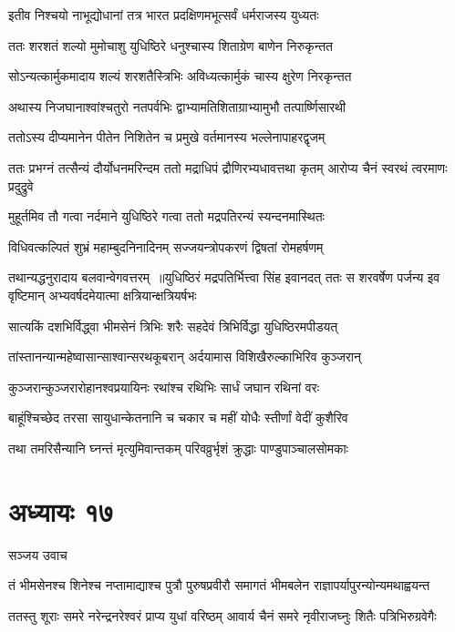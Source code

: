 \twolineshloka
{इतीव निश्चयो नाभूद्योधानां तत्र भारत}
{प्रदक्षिणमभूत्सर्वं धर्मराजस्य युध्यतः}


\twolineshloka
{ततः शरशतं शल्यो मुमोचाशु युधिष्ठिरे}
{धनुश्चास्य शिताग्रेण बाणेन निरुकृन्तत}


\twolineshloka
{सोऽन्यत्कार्मुकमादाय शल्यं शरशतैस्त्रिभिः}
{अविध्यत्कार्मुकं चास्य क्षुरेण निरकृन्तत}


\twolineshloka
{अथास्य निजघानाश्वांश्चतुरो नतपर्वभिः}
{द्वाभ्यामतिशिताग्राभ्यामुभौ तत्पार्ष्णिसारथी}


\twolineshloka
{ततोऽस्य दीप्यमानेन पीतेन निशितेन च}
{प्रमुखे वर्तमानस्य भल्लेनापाहरद्वृजम्}


ततः प्रभग्नं तत्सैन्यं दौर्योधनमरिन्दम
\twolineshloka
{ततो मद्राधिपं द्रौणिरभ्यधावत्तथा कृतम्}
{आरोप्य चैनं स्वरथं त्वरमाणः प्रदुद्रुवे}


\twolineshloka
{मुहूर्तमिव तौ गत्वा नर्दमाने युधिष्ठिरे}
{गत्वा ततो मद्रपतिरन्यं स्यन्दनमास्थितः}


\twolineshloka
{विधिवत्कल्पितं शुभ्रं महाम्बुदनिनादिनम्}
{सज्जयन्त्रोपकरणं द्विषतां रोमहर्षणम्}


तथान्यद्धनुरादाय बलवान्वेगवत्तरम् ॥युधिष्ठिरं मद्रपतिर्भित्त्वा सिंह इवानदत्
\twolineshloka
{ततः स शरवर्षेण पर्जन्य इव वृष्टिमान्}
{अभ्यवर्षदमेयात्मा क्षत्रियान्क्षत्रियर्षभः}


\twolineshloka
{सात्यकिं दशभिर्विद्ध्वा भीमसेनं त्रिभिः शरैः}
{सहदेवं त्रिभिर्विद्धा युधिष्ठिरमपीडयत्}


\twolineshloka
{तांस्तानन्यान्महेष्वासान्साश्वान्सरथकूबरान्}
{अर्दयामास विशिखैरुल्काभिरिव कुञ्जरान्}


\twolineshloka
{कुञ्जरान्कुञ्जरारोहानश्वप्रयायिनः}
{रथांश्च रथिभिः सार्धं जघान रथिनां वरः}


\twolineshloka
{बाहूंश्चिच्छेद तरसा सायुधान्केतनानि च}
{चकार च महीं योधैः स्तीर्णां वेदीं कुशैरिव}


\twolineshloka
{तथा तमरिसैन्यानि घ्नन्तं मृत्युमिवान्तकम्}
{परिवव्रुर्भृशं क्रुद्धाः पाण्डुपाञ्चालसोमकाः}


\chapter{अध्यायः १७}
\twolineshloka
{सञ्जय उवाच}
{}


\twolineshloka
{तं भीमसेनश्च शिनेश्च नप्तामाद्याश्च पुत्रौ पुरुषप्रवीरौ}
{समागतं भीमबलेन राज्ञापर्यापुरन्योन्यमथाह्वयन्त}


\twolineshloka
{ततस्तु शूराः समरे नरेन्द्रनरेश्वरं प्राप्य युधां वरिष्ठम्}
{आवार्य चैनं समरे नृवीराजघ्नुः शितैः पत्रिभिरुग्रवेगैः}


